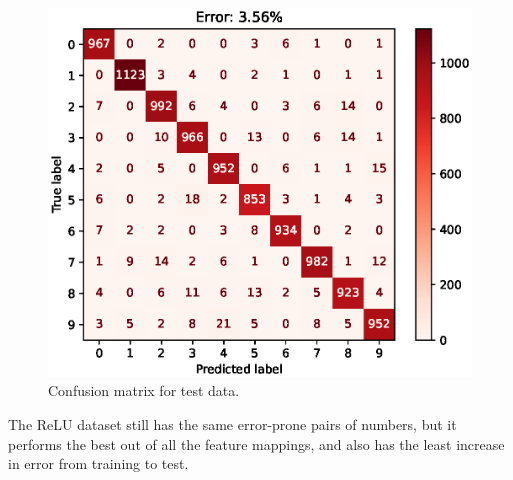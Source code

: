 \documentclass{article}
\begin{document}
\begin{figure}[h!]
\begin{minipage}{0.5\textwidth}
        \includegraphics[width=\textwidth]{images/one_vs_one_test_confusion_matrix_ReLU.eps}
        \caption{Confusion matrix for test data.}
    \end{minipage}
\end{figure}
The ReLU dataset still has the same error-prone pairs of numbers, but it performs the best out of all the feature mappings, and also has the least increase in error from training to test.

\FloatBarrier
\end{document}
